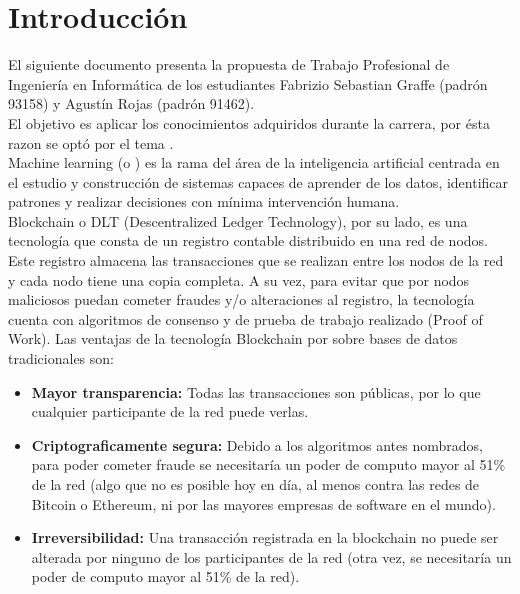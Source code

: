 \documentclass[
11pt, %
oneside, %
spanish, %
singlespacing, %
headsepline, %
chapterinoneline, %
]{MastersDoctoralThesis} %
\begin{document}

\tableofcontents %


\mainmatter %

\pagestyle{thesis} %

\chapter{Introducci\'on}
El siguiente documento presenta la propuesta de Trabajo Profesional de Ingeniería en Informática de los estudiantes Fabrizio Sebastian Graffe (padrón 93158) y Agustín Rojas (padrón 91462). \\

El objetivo es aplicar los conocimientos adquiridos durante la carrera, por ésta razon se optó por el tema \textbf{ }. \\

Machine learning (o ) es la rama del área de la inteligencia artificial centrada en el estudio y construcción de sistemas capaces de aprender de los datos, identificar patrones y realizar decisiones con mínima intervención humana. \\

Blockchain \cite{bc} o DLT (Descentralized Ledger Technology), por su lado, es una tecnología que consta de un registro contable distribuido en una red de nodos. Este registro almacena las transacciones que se realizan entre los nodos de la red y cada nodo tiene una copia completa. A su vez, para evitar que por nodos maliciosos puedan cometer fraudes y/o alteraciones al registro, la tecnología cuenta con algoritmos de consenso y de prueba de trabajo realizado (Proof of Work).
Las ventajas de la tecnología Blockchain por sobre bases de datos tradicionales son:
\begin{itemize}
\item \textbf{Mayor transparencia:} Todas las transacciones son públicas, por lo que cualquier participante de la red puede verlas.
\item \textbf{Criptograficamente segura:} Debido a los algoritmos antes nombrados, para poder cometer fraude se necesitaría un poder de computo mayor al 51\% de la red (algo que no es posible hoy en día, al menos contra las redes de Bitcoin o Ethereum, ni por las mayores empresas de software en el mundo).
\item \textbf{Irreversibilidad:} Una transacción registrada en la blockchain no puede ser alterada por ninguno de los participantes de la red (otra vez, se necesitaría un poder de computo mayor al 51\% de la red).
\end{itemize}
\end{document}
